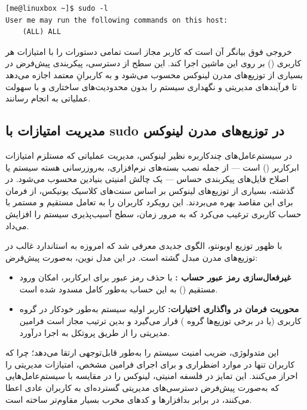 \begin{latin}
\begin{lstlisting}
[me@linuxbox ~]$ sudo -l
User me may run the following commands on this host:
    (ALL) ALL
\end{lstlisting}
\end{latin}

خروجی فوق بیانگر آن است که کاربر  مجاز است تمامی دستورات را با امتیازات هر کاربری () بر روی این ماشین اجرا کند. این سطح از دسترسی، پیکربندی پیش‌فرض در بسیاری از توزیع‌های مدرن لینوکس محسوب می‌شود و به کاربرانِ معتمد اجازه می‌دهد تا فرآیندهای مدیریتی و نگهداری سیستم را بدون محدودیت‌های ساختاری و با سهولت عملیاتی به انجام رسانند.

\subsection{مدیریت امتیازات با sudo در توزیع‌های مدرن لینوکس}

در سیستم‌عامل‌های چندکاربره نظیر لینوکس، مدیریت عملیاتی که مستلزم امتیازات ابرکاربر () است — از جمله نصب بسته‌های نرم‌افزاری، به‌روزرسانی هسته سیستم یا اصلاح فایل‌های پیکربندی حساس — یک چالش امنیتی بنیادین محسوب می‌شود. در گذشته، بسیاری از توزیع‌های لینوکس بر اساس سنت‌های کلاسیک یونیکس، از فرمان  برای این مقاصد بهره می‌بردند. این رویکرد کاربران را به تعامل مستقیم و مستمر با حساب کاربری  ترغیب می‌کرد که به مرور زمان، سطح آسیب‌پذیری سیستم را افزایش می‌داد.

با ظهور توزیع اوبونتو، الگوی جدیدی معرفی شد که امروزه به استاندارد غالب در توزیع‌های مدرن مبدل گشته است. در این مدل نوین، به‌صورت پیش‌فرض:

\begin{itemize}
  \item \textbf{غیرفعال‌سازی رمز عبور حساب :} با حذف رمز عبور برای ابرکاربر، امکان ورود مستقیم () به این حساب به‌طور کامل مسدود شده است.
  \item \textbf{محوریت فرمان  در واگذاری اختیارات:} کاربر اولیه سیستم به‌طور خودکار در گروه کاربری  (یا در برخی توزیع‌ها گروه ) قرار می‌گیرد و بدین ترتیب مجاز است فرامین مدیریتی را از طریق پروتکل  به اجرا درآورد.
\end{itemize}

این متدولوژی، ضریب امنیت سیستم را به‌طور قابل‌توجهی ارتقا می‌دهد؛ چرا که کاربران تنها در موارد اضطراری و برای اجرای فرامین مشخص، امتیازات مدیریتی را احراز می‌کنند. این تمایز در فلسفه امنیتی، لینوکس را در مقایسه با سیستم‌عامل‌هایی که به‌صورت پیش‌فرض دسترسی‌های مدیریتی گسترده‌ای به کاربران عادی اعطا می‌کنند، در برابر بدافزارها و کدهای مخرب بسیار مقاوم‌تر ساخته است.

